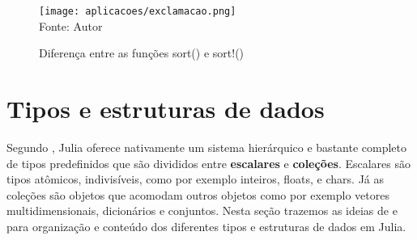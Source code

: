     \begin{figure}[H]%
    \begin{center}
      \label{exclamacao}
      \caption{Diferença entre as funções sort() e sort!()} 
        \texttt{[image: aplicacoes/exclamacao.png]} \\
        {\tiny \sf Fonte: Autor}
    \end{center}
    \end{figure} 
\section{Tipos e estruturas de dados}
Segundo \cite{Lobianco2019}, Julia oferece nativamente um sistema hierárquico e bastante completo de tipos predefinidos que são divididos entre \textbf{escalares} e \textbf{coleções}.
Escalares são tipos atômicos, indivisíveis, como por exemplo inteiros, floats, e chars. Já as coleções são objetos que acomodam outros objetos como por exemplo vetores multidimensionais, dicionários e conjuntos. 
Nesta seção trazemos as ideias de \cite{Lobianco2019} e \cite{Balbaert2016} para organização e conteúdo dos diferentes tipos e estruturas de dados em Julia.

